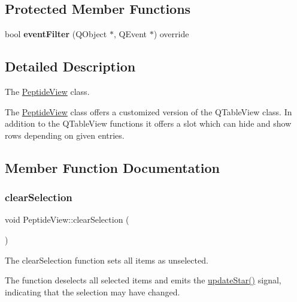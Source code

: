 \subsection*{Protected Member Functions}
\begin{DoxyCompactItemize}
\item 
\mbox{\label{class_peptide_view_a6c451e673bc3e13c3dfe1de10505f567}} 
bool {\bfseries event\+Filter} (Q\+Object $\ast$, Q\+Event $\ast$) override
\end{DoxyCompactItemize}


\subsection{Detailed Description}
The \mbox{\hyperlink{class_peptide_view}{Peptide\+View}} class. 

The \mbox{\hyperlink{class_peptide_view}{Peptide\+View}} class offers a customized version of the Q\+Table\+View class. In addition to the Q\+Table\+View functions it offers a slot which can hide and show rows depending on given entries. 

\subsection{Member Function Documentation}
\mbox{\label{class_peptide_view_a8f1b5cfad280a3eb8e4a290cdef588bd}} 
\subsubsection{\texorpdfstring{clear\+Selection}{clearSelection}}
{\footnotesize\ttfamily void Peptide\+View\+::clear\+Selection (\begin{DoxyParamCaption}{ }\end{DoxyParamCaption})\hspace{0.3cm}{\ttfamily [slot]}}



The clear\+Selection function sets all items as unselected. 

The function deselects all selected items and emits the \mbox{\hyperlink{class_peptide_view_acaeeae28c65e40998f8b9f5eaf829f71}{update\+Star()}} signal, indicating that the selection may have changed. \mbox{\label{class_peptide_view_a44ff37ec18e1e1c61c8747b6fe79e076}} 
